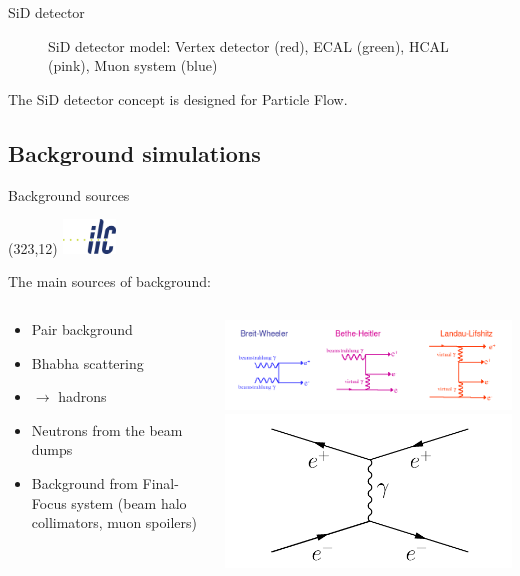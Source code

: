 \documentclass[xcolor={dvipsnames}]{beamer}
\newcommand{\ilclogo}{
  \setlength{\TPHorizModule}{1pt}
  \setlength{\TPVertModule}{1pt}
  \begin{textblock}{1}(323,12)
   \includegraphics[width=40pt,height=26pt]{figures/ILC.jpeg}
  \end{textblock}
}
\begin{document}
\begin{frame}{SiD detector}
\begin{figure}[T]
\begin{subfigure}[b]{0.49\textwidth}
\end{subfigure}
\caption{\small SiD detector model: Vertex detector (red), ECAL (green), HCAL (pink), Muon system (blue)}
\end{figure}
The SiD detector concept is designed for Particle Flow.
\end{frame}

\subsection{Background simulations}

\begin{frame}{Background sources}
\ilclogo
The main sources of background:
\begin{columns}
 \begin{column}{0.55\textwidth}
  \begin{itemize}
    \item Pair background
    \item Bhabha scattering
    \item \textgamma \textgamma $\rightarrow$ hadrons
    \item Neutrons from the beam dumps
    \item Background from Final-Focus system (beam halo collimators, muon spoilers)
  \end{itemize}
 \end{column}
 \begin{column}{0.45\textwidth}
 \includegraphics[height=0.2\textheight]{figures/beamstrahlung_processes.png}\\
 \includegraphics[height=0.15\textheight]{figures/bhabha_scattering.pdf} 

\end{column}
\end{columns}
\end{frame}
\end{document}
